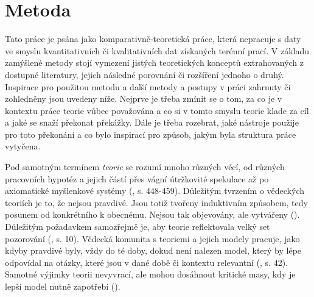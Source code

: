 \documentclass[11pt,a4paper]{article}
\begin{document}
\pagebreak


\section*{Metoda}

Tato práce je psána jako komparativně-teoretická práce, která nepracuje s daty ve smyslu kvantitativních či kvalitativních dat získaných terénní prací. V základu zamýšlené metody stojí vymezení jistých teoretických konceptů extrahovaných z dostupné literatury, jejich následné porovnání či rozšíření jednoho o druhý. Inspirace pro použitou metodu a další metody a postupy v práci zahrnuty či zohledněny jsou uvedeny níže. Nejprve je třeba zmínit se o tom, za co je v kontextu práce teorie vůbec považována a co si v tomto smyslu teorie klade za cíl a jaké se snaží překonat překážky. Dále je třeba rozebrat, jaké nástroje použije pro toto překonání a co bylo inspirací pro způsob, jakým byla struktura práce vytyčena.

Pod samotným termínem \textit{teorie} se rozumí mnoho různých věcí, od různých pracovních hypotéz a jejich částí přes vágní útržkovité spekulace až po axiomatické myšlenkové systémy (\cite{calhoun_sociological_2007}, s. 448-459). Důležitým tvrzením o vědeckých teoriích je to, že nejsou pravdivé. Jsou totiž tvořeny induktivním způsobem, tedy posunem od konkrétního k obecnému. Nejsou tak objevovány, ale vytvářeny (\cite{mintzberg_developing_2014}). Důležitým požadavkem samozřejmě je, aby teorie reflektovala velký set pozorování (\cite{hawking_brief_1998}, s. 10). Vědecká komunita s teoriemi a jejich modely pracuje, jako kdyby pravdivé byly, vždy do té doby, dokud není nalezen model, který by lépe odpovídal na otázky, které jsou v dané době či kontextu relevantní (\cite{barbara_m_wildemuth_questions_2017}, s. 42). Samotné výjimky teorii nevyvrací, ale mohou dosáhnout kritické masy, kdy je lepší model nutně zapotřebí (\cite{kuhn_structure_2012}).
\end{document}
